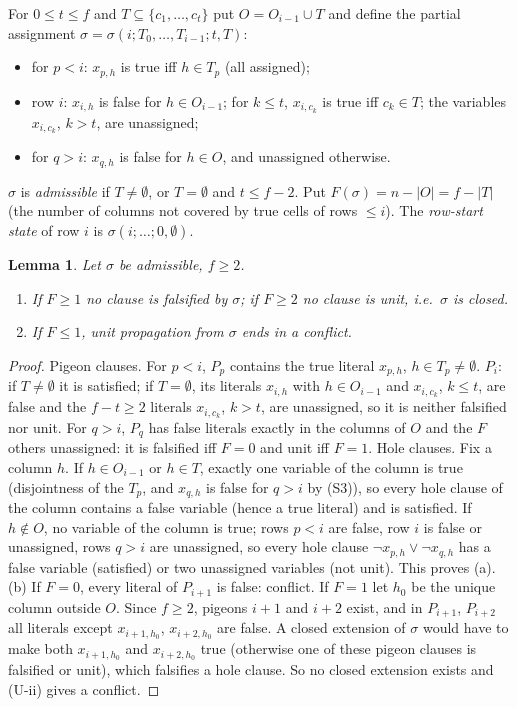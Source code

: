\documentclass[11pt]{article}
\newtheorem{lemma}{Lemma}
\theoremstyle{definition}
\theoremstyle{remark}
\begin{document}
For $0\le t\le f$ and $T\subseteq\{c_1,\dots,c_t\}$ put $O=O_{i-1}\cup T$ and define the partial
assignment $\sigma=\sigma(i;T_0,\dots,T_{i-1};t,T)$:
\begin{itemize}
\item[(S1)] for $p<i$: $x_{p,h}$ is true iff $h\in T_p$ (all assigned);
\item[(S2)] row $i$: $x_{i,h}$ is false for $h\in O_{i-1}$; for $k\le t$, $x_{i,c_k}$ is true iff
  $c_k\in T$; the variables $x_{i,c_k}$, $k>t$, are unassigned;
\item[(S3)] for $q>i$: $x_{q,h}$ is false for $h\in O$, and unassigned otherwise.
\end{itemize}
$\sigma$ is \emph{admissible} if $T\ne\emptyset$, or $T=\emptyset$ and $t\le f-2$. Put
$F(\sigma)=n-|O|=f-|T|$ (the number of columns not covered by true cells of rows $\le i$).
The \emph{row-start state} of row $i$ is $\sigma(i;\dots;0,\emptyset)$.

\begin{lemma}\label{lem:pig1}
Let $\sigma$ be admissible, $f\ge2$.
\begin{enumerate}
\item[(a)] If $F\ge1$ no clause is falsified by $\sigma$; if $F\ge2$ no clause is unit, i.e.\ $\sigma$ is
  closed.
\item[(b)] If $F\le1$, unit propagation from $\sigma$ ends in a conflict.
\end{enumerate}
\end{lemma}
\begin{proof}
Pigeon clauses. For $p<i$, $P_p$ contains the true literal $x_{p,h}$, $h\in T_p\ne\emptyset$.
$P_i$: if $T\neq\emptyset$ it is satisfied; if $T=\emptyset$, its literals $x_{i,h}$ with $h\in O_{i-1}$
and $x_{i,c_k}$, $k\le t$, are false and the $f-t\ge2$ literals $x_{i,c_k}$, $k>t$, are unassigned, so it
is neither falsified nor unit. For $q>i$, $P_q$ has false literals exactly in the columns of $O$ and
the $F$ others unassigned: it is falsified iff $F=0$ and unit iff $F=1$.
Hole clauses. Fix a column $h$. If $h\in O_{i-1}$ or $h\in T$, exactly one variable of the column is
true (disjointness of the $T_p$, and $x_{q,h}$ is false for $q>i$ by (S3)), so every hole clause of the column
contains a false variable (hence a true literal) and is satisfied. If $h\notin O$, no variable of the column is true;
rows $p<i$ are false, row $i$ is false or unassigned, rows $q>i$ are unassigned, so every hole clause
$\neg x_{p,h}\vee\neg x_{q,h}$ has a false variable (satisfied) or two unassigned variables (not unit).
This proves (a).
(b) If $F=0$, every literal of $P_{i+1}$ is false: conflict. If $F=1$ let $h_0$ be the unique column
outside $O$. Since $f\ge 2$, pigeons $i+1$ and $i+2$ exist, and in $P_{i+1}$, $P_{i+2}$ all literals
except $x_{i+1,h_0}$, $x_{i+2,h_0}$ are false. A closed extension of $\sigma$ would have to make both
$x_{i+1,h_0}$ and $x_{i+2,h_0}$ true (otherwise one of these pigeon clauses is falsified or unit), which
falsifies a hole clause. So no closed extension exists and (U-ii) gives a conflict.
\end{proof}
\end{document}
